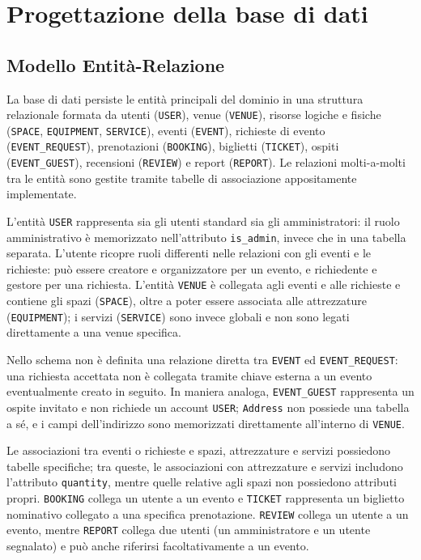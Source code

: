 \chapter{Progettazione della base di dati}
\label{cap:database}

\section{Modello Entità-Relazione}

La base di dati persiste le entità principali del dominio in una struttura relazionale formata da utenti (\texttt{USER}), venue (\texttt{VENUE}), risorse logiche e fisiche (\texttt{SPACE}, \texttt{EQUIPMENT}, \texttt{SERVICE}), eventi (\texttt{EVENT}), richieste di evento (\texttt{EVENT\_REQUEST}), prenotazioni (\texttt{BOOKING}), biglietti (\texttt{TICKET}), ospiti (\texttt{EVENT\_GUEST}), recensioni (\texttt{REVIEW}) e report (\texttt{REPORT}). Le relazioni molti-a-molti tra le entità sono gestite tramite tabelle di associazione appositamente implementate.

L'entità \texttt{USER} rappresenta sia gli utenti standard sia gli amministratori: il ruolo amministrativo è memorizzato nell'attributo \texttt{is\_admin}, invece che in una tabella separata. L'utente ricopre ruoli differenti nelle relazioni con gli eventi e le richieste: può essere creatore e organizzatore per un evento, e richiedente e gestore per una richiesta. L'entità \texttt{VENUE} è collegata agli eventi e alle richieste e contiene gli spazi (\texttt{SPACE}), oltre a poter essere associata alle attrezzature (\texttt{EQUIPMENT}); i servizi (\texttt{SERVICE}) sono invece globali e non sono legati direttamente a una venue specifica.

Nello schema non è definita una relazione diretta tra \texttt{EVENT} ed \texttt{EVENT\_REQUEST}: una richiesta accettata non è collegata tramite chiave esterna a un evento eventualmente creato in seguito. In maniera analoga, \texttt{EVENT\_GUEST} rappresenta un ospite invitato e non richiede un account \texttt{USER}; \texttt{Address} non possiede una tabella a sé, e i campi dell'indirizzo sono memorizzati direttamente all'interno di \texttt{VENUE}.

Le associazioni tra eventi o richieste e spazi, attrezzature e servizi possiedono tabelle specifiche; tra queste, le associazioni con attrezzature e servizi includono l'attributo \texttt{quantity}, mentre quelle relative agli spazi non possiedono attributi propri. \texttt{BOOKING} collega un utente a un evento e \texttt{TICKET} rappresenta un biglietto nominativo collegato a una specifica prenotazione. \texttt{REVIEW} collega un utente a un evento, mentre \texttt{REPORT} collega due utenti (un amministratore e un utente segnalato) e può anche riferirsi facoltativamente a un evento.

